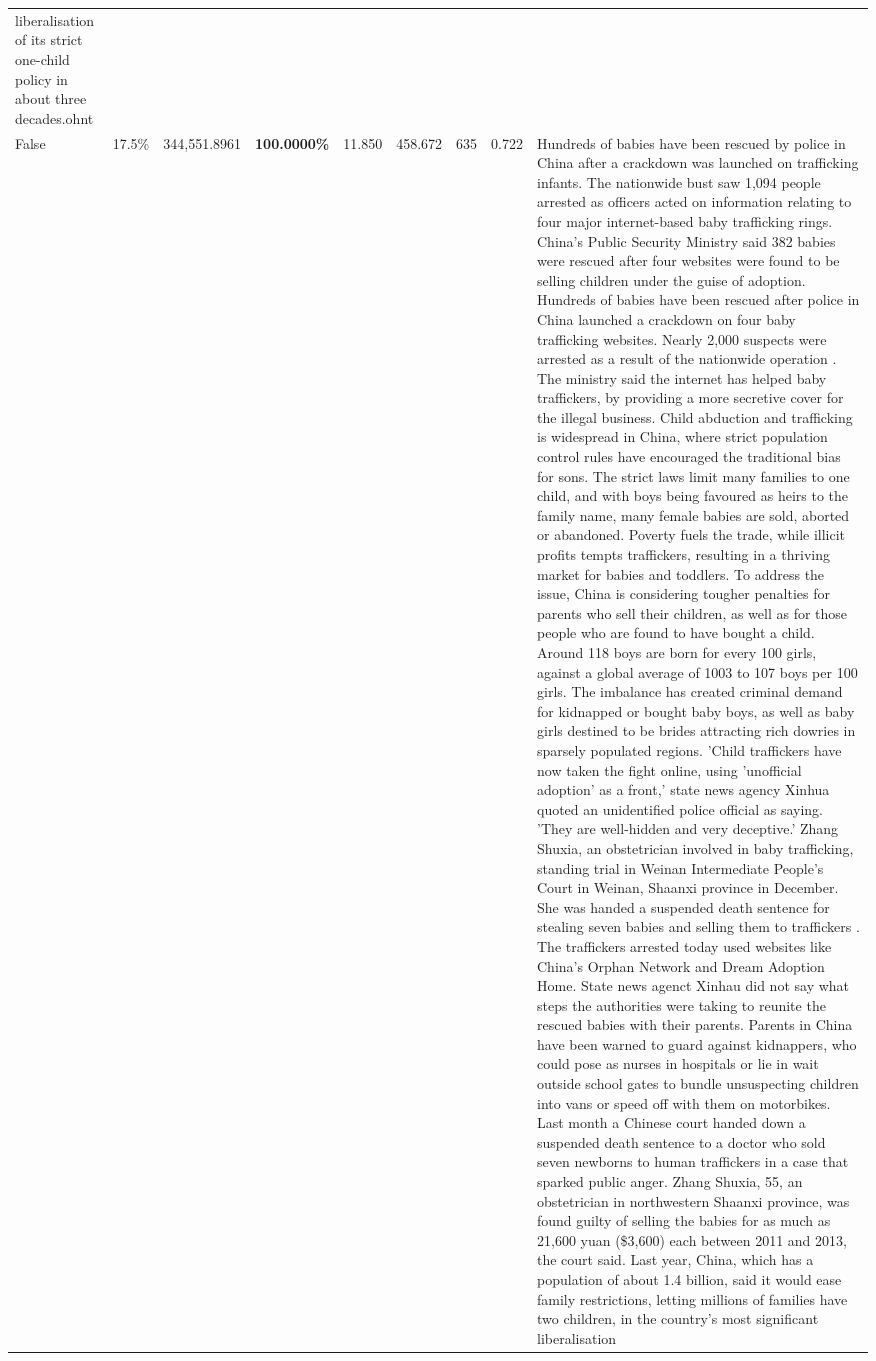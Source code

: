 \begin{table}[H]
\begin{tabular}{lllrlllll}
liberalisation of its strict one-child policy in about three decades.ohnt \\
\cline{1-9}
False & 17.5\% & 344,551.8961 & \bfseries \color{red} 100.0000\% & 11.850 & 458.672 & 635 & 0.722 & Hundreds of babies have been rescued by police in China after a crackdown was launched on trafficking infants. The nationwide bust saw 1,094 people arrested as officers acted on information relating to four major internet-based baby trafficking rings. China's Public Security Ministry said 382 babies were rescued after four websites were found to be selling children under the guise of adoption. Hundreds of babies have been rescued after police in China launched a crackdown on four baby trafficking websites. Nearly 2,000 suspects were arrested as a result of the nationwide operation . The ministry said the internet has helped baby traffickers, by providing a more secretive cover for the illegal business. Child abduction and trafficking is widespread in China, where strict population control rules have encouraged the traditional bias for sons. The strict laws limit many families to one child, and with boys being favoured as heirs to the family name, many female babies are sold, aborted or abandoned. Poverty fuels the trade, while illicit profits tempts traffickers, resulting in a thriving market for babies and toddlers. To address the issue, China is considering tougher penalties for parents who sell their children, as well as for those people who are found to have bought a child. Around 118 boys are born for every 100 girls, against a global average of 1003 to 107 boys per 100 girls. The imbalance has created criminal demand for kidnapped or bought baby boys, as well as baby girls destined to be brides attracting rich dowries in sparsely populated regions. 'Child traffickers have now taken the fight online, using 'unofficial adoption' as a front,' state news agency Xinhua quoted an unidentified police official as saying. 'They are well-hidden and very deceptive.' Zhang Shuxia, an obstetrician involved in baby trafficking, standing trial in Weinan Intermediate People's Court in Weinan, Shaanxi province in December. She was handed a suspended death sentence for stealing seven babies and selling them to traffickers . The traffickers arrested today used websites like China's Orphan Network and Dream Adoption Home. State news agenct Xinhau did not say what steps the authorities were taking to reunite the rescued babies with their parents. Parents in China have been warned to guard against kidnappers, who could pose as nurses in hospitals or lie in wait outside school gates to bundle unsuspecting children into vans or speed off with them on motorbikes. Last month a Chinese court handed down a suspended death sentence to a doctor who sold seven newborns to human traffickers in a case that sparked public anger. Zhang Shuxia, 55, an obstetrician in northwestern Shaanxi province, was found guilty of selling the babies for as much as 21,600 yuan (\$3,600) each between 2011 and 2013, the court said. Last year, China, which has a population of about 1.4 billion, said it would ease family restrictions, letting millions of families have two children, in the country's most significant liberalisation 
\end{tabular}
\end{table}
